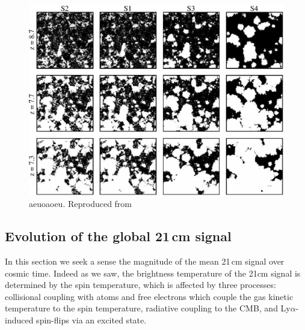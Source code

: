 \begin{figure}
	\centering
	\includegraphics[width=7in]{chap0_intro/mcquinn_ionized_region_sims.eps}
	\caption[aoeuaoeu]{aeuoaoeu. Reproduced from \citet{McQuinn06}}
	\label{fig:mcquinneorsims}
\end{figure}



\subsection{Evolution of the global 21\,cm signal}

In this section we seek a sense the magnitude of the mean 21\,cm signal over cosmic time. Indeed as we saw, the brightness temperature of the 21cm signal is determined by the spin temperature, which is affected by three processes: collisional coupling with atoms and free electrons which couple the gas kinetic temperature to the spin temperature, radiative coupling to the CMB, and Ly$\alpha$-induced spin-flips via an excited state. 

